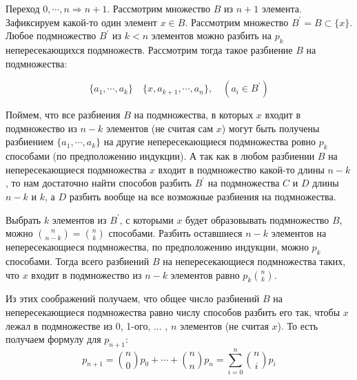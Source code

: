 \documentclass{article}
\begin{document}
	Переход ${0, \cdots, n} \Rightarrow n + 1$.
	Рассмотрим множество $B$ из $n + 1$ элемента. Зафиксируем какой-то один элемент $x \in B$. Рассмотрим множество $B^{\prime} = B \subset \{x\}$. Любое подмножество $B^{\prime}$ из $k < n$ элементов можно разбить на $p_k$ непересекающихся подмножеств. Рассмотрим тогда такое разбиение $B$ на подмножества:
	
	$$\{a_1, \cdots,a_k\} \quad \{x, a_{k + 1},\cdots, a_{n}\}, \quad (a_i \in B^{\prime})$$
	
	Поймем, что все разбиения $B$ на подмножества, в которых $x$ входит в подмножество из $n - k$ элементов (не считая сам $x$)  могут быть получены разбиением $ \{a_1, \cdots,a_k\} $ на другие непересекающиеся подмножества ровно $p_k$ способами (по предположению индукции). А так как в любом разбиении $B$ на непересекающиеся подмножества $x$ входит в подмножество какой-то длины $n - k$, то нам достаточно найти способов разбить $B^{\prime}$ на подмножества $C$ и $D$ длины $n - k$ и $k$, а $D$ разбить вообще на все возможные разбиения на подмножества.
	
	Выбрать $k$ элементов из $B^{\prime}$, с которыми $x$ будет образовывать подмножество $B$, можно ${n \choose n - k} = {n \choose k} $ способами. Разбить оставшиеся $n - k$ элементов на непересекающиеся подмножества, по предположению индукции, можно $p_{k}$ способами. Тогда всего разбиений $B$ на непересекающиеся подмножества таких, что $x$ входит в подмножество из $n - k$ элементов равно $p_{k} {n \choose k}$.
	
	Из этих соображений получаем, что общее число разбиений $B$ на непересекающиеся подмножества равно числу способов разбить его так, чтобы $x$ лежал в подмножестве из 0, 1-ого, ... , $n$ элементов (не считая $x$). То есть получаем формулу для $p_{n + 1}$: 
	$$ p_{n+1} = {n \choose 0} p_0 + \cdots + {n \choose n} p_n= \sum_{i=0}^{n} {n \choose i} p_i$$    
\end{document}
